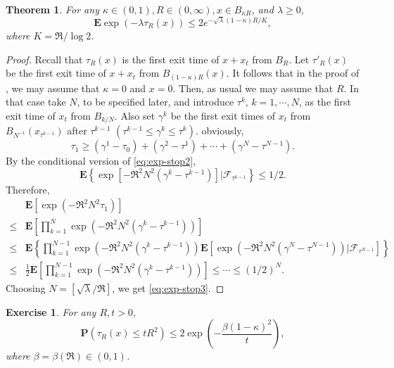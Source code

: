 \documentclass[twoside, 12pt]{book}
\numberwithin{equation}{chapter}
\newtheorem{theorem}{Theorem}[section]
\newtheorem{exercise}{Exercise}[section]
\def\cF{{\mathcal F}}
\def\bE{{\mathbf E}}
\def\bP{{\mathbf P}}
\def\l{\left}
\def\r{\right}
\def\geq{\geqslant}
\def\leq{\leqslant}
\begin{document}
	\begin{theorem}
		For any $\kappa \in(0,1), R \in(0, \infty), x \in B_{\kappa R}$, and $\lambda \geq 0$,
		\begin{equation}\label{eq:exp-stop3}
			\bE  \exp \left(-\lambda{\tau_R(x)}\right) \leq 2 e^{-\sqrt{\lambda}(1-\kappa) R / K},
		\end{equation}
		where $K= \mathfrak{R}/ \log 2$. 
	\end{theorem}
	\begin{proof}
		Recall that $\tau_R(x)$ is the first exit time of $x+x_t$ from $B_R$. Let $\tau'_R(x)$ be the first exit time of $x+x_t$ from $B_{(1-\kappa)R}(x)$. It follows that in the proof of , we may assume that $\kappa=0$ and $x=0$. Then, as usual we may assume that $R$. In that case take $N$, to be specified later, and introduce $\tau^{k}$, $k=1,\cdots, N$, as the first exit time of $x_t$ from $B_{k/N}$. Also set $\gamma^k$ be the first exit times of $x_t$ from $B_{N^{-1}}(x_{\tau^{k-1}})$ after $\tau^{k-1}$ $(\tau^{k-1}\leq \gamma^k\leq \tau^k)$. obviously, 
		\[
		\tau_1\geq (\gamma^1-\tau_0)+ (\gamma^2-\tau^1)+\cdots+ (\gamma^N-\tau^{N-1}). 
		\]
		By the conditional version of \eqref{eq:exp-stop2}, 
		\begin{equation*}
			\bE \l\{\exp\l[-\mathfrak{R}^2N^2 (\gamma^k-\tau^{k-1}) \r]| \cF_{\tau^{k-1}}\r\}\leq 1/2. 
		\end{equation*}
		Therefore, 
		\begin{equation}\label{eq:exp-stop4}
			\begin{aligned}
				&\bE \l[ \exp\l(-\mathfrak{R}^2N^2 \tau_1 \r)\r]\\
				\leq & \bE \l[\prod_{k=1}^{N}\exp\l(-\mathfrak{R}^2N^2 (\gamma^k-\tau^{k-1}) \r)\r]\\ 
				\leq & \bE \l\{ \prod_{k=1}^{N-1}\exp\l(-\mathfrak{R}^2N^2 (\gamma^k-\tau^{k-1}) \r) \bE \l[ \exp\l(-\mathfrak{R}^2N^2 (\gamma^N-\tau^{N-1}) \r)\Big| \cF_{\tau^{N-1}}\r] \r\}\\ 
				\leq & \frac{1}{2} \bE \l[\prod_{k=1}^{N-1}\exp\l(-\mathfrak{R}^2N^2 (\gamma^k-\tau^{k-1}) \r)\r] \leq \cdots \leq (1/2)^N. 
			\end{aligned}
		\end{equation}
		Choosing  $N= [\sqrt{\lambda}/\mathfrak{R}]$, we get \eqref{eq:exp-stop3}. 
	\end{proof}
	\begin{exercise}
		For any $R, t >0$, 
		\begin{equation}\label{eq:stop-lower2}
			\bP\left({\tau_R(x)} \leq t R^2\right) \leq 2 \exp \left(-\frac{\beta(1-\kappa)^2}{t}\right), 
		\end{equation}
		where $\beta=\beta(\mathfrak{R})\in (0,1)$.
	\end{exercise}
	
\end{document}
